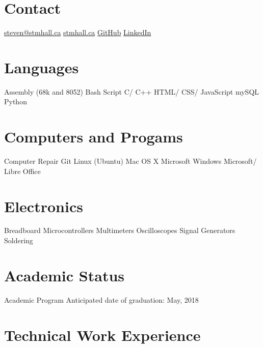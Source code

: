 \documentclass[]{friggeri-cv} %
\begin{document}


\begin{aside} %
\section{Contact}
\href{mailto:steven@stmhall.ca}{steven@stmhall.ca}
\href{http://stmhall.ca}{stmhall.ca}
\href{http://github.com/hallzy}{GitHub}
\href{https://www.linkedin.com/in/steventmhall}{LinkedIn}
\section{Languages}
Assembly (68k and 8052)
Bash Script
C/ C++
HTML/ CSS/ JavaScript
mySQL
Python
\section{Computers and Progams}
Computer Repair
Git
Linux (Ubuntu)
Mac OS X
Microsoft Windows
Microsoft/ Libre Office
\section{Electronics}
Breadboard
Microcontrollers
Multimeters
Oscilloscopes
Signal Generators
Soldering
\end{aside}

\section{Academic Status}

\begin{entrylist}

\entry
{}
{Academic Program}
{}
{
Anticipated date of graduation: May, 2018
}
\end{entrylist}

\section{Technical Work Experience}
\end{document}
